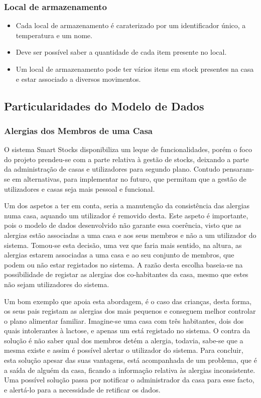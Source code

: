 \subsubsection{Local de armazenamento}
\begin{itemize}
	\item Cada local de armazenamento é caraterizado por um identificador único, a temperatura e um nome.
	\item Deve ser possível saber a quantidade de cada item presente no local.
	\item Um local de armazenamento pode ter vários itens em stock presentes na casa e estar associado a diversos movimentos.
\end{itemize}

\subsection{Particularidades do Modelo de Dados}

\subsubsection{Alergias dos Membros de uma Casa}

O sistema Smart Stocks disponibiliza um leque de funcionalidades, porém o foco do projeto prendeu-se com a parte relativa à gestão de stocks, deixando a parte da administração de casas e utilizadores para segundo plano. Contudo pensaram-se em alternativas, para implementar no futuro, que permitam que a gestão de utilizadores e casas seja mais pessoal e funcional. 

Um dos aspetos a ter em conta, seria a manutenção da consistência das alergias numa casa, aquando um utilizador é removido desta. Este aspeto é importante, pois o modelo de dados desenvolvido não garante essa coerência, visto que as alergias estão associadas a uma casa e aos seus membros e não a um utilizador do sistema. Tomou-se esta decisão, uma vez que faria mais sentido, na altura, as alergias estarem associadas a uma casa e ao seu conjunto de membros, que podem ou não estar registados no sistema. A razão desta escolha baseia-se na possibilidade de registar as alergias dos co-habitantes da casa, mesmo que estes não sejam utilizadores do sistema. 

Um bom exemplo que apoia esta abordagem, é o caso das crianças, desta forma, os seus pais registam as alergias dos mais pequenos e conseguem melhor controlar o plano alimentar familiar. Imagine-se uma casa com três habitantes, dois dos quais intolerantes à lactose, e apenas um está registado no sistema. O contra da solução é não saber qual dos membros detém a alergia, todavia, sabe-se que a mesma existe e assim é possível alertar o utilizador do sistema. Para concluir, esta solução apesar das suas vantagens, está acompanhada de um problema, que é a saída de alguém da casa, ficando a informação relativa às alergias inconsistente. Uma possível solução passa por notificar o administrador da casa para esse facto, e alertá-lo para a necessidade de retificar os dados.

